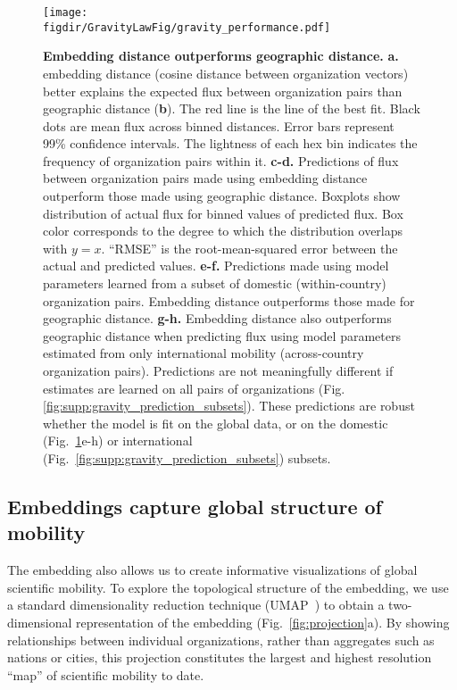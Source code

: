 \documentclass[12pt]{article} %
\def\figdir{../Figs}
\begin{document}
%
%
\begin{figure}[h!]
	\centering
	\texttt{[image: \\figdir/GravityLawFig/gravity\_performance.pdf]}
	\caption{
		\textbf{Embedding distance outperforms geographic distance.}
		\textbf{a.} embedding distance (cosine distance between organization vectors) better explains the expected flux between organization pairs than geographic distance (\textbf{b}).
		The red line is the line of the best fit.
		Black dots are mean flux across binned distances.
		Error bars represent 99\% confidence intervals.
		The lightness of each hex bin indicates the frequency of organization pairs within it.
		\textbf{c-d.} Predictions of flux between organization pairs made using embedding distance outperform those made using geographic distance.
		Boxplots show distribution of actual flux for binned values of predicted flux.
		Box color corresponds to the degree to which the distribution overlaps with $y = x$.
		``RMSE'' is the root-mean-squared error between the actual and predicted values.
		\textbf{e-f.} Predictions made using model parameters learned from a subset of domestic (within-country) organization pairs.
		Embedding distance outperforms those made for geographic distance.
		\textbf{g-h.} Embedding distance also outperforms geographic distance when predicting flux using model parameters estimated from only international mobility (across-country organization pairs).
		Predictions are not meaningfully different if estimates are learned on all pairs of organizations (Fig. \ref{fig:supp:gravity_prediction_subsets}).
		These predictions are robust whether the model is fit on the global data, or on the domestic (Fig.~\ref{fig:gravity_performance}e-h) or international (Fig.~\ref{fig:supp:gravity_prediction_subsets}) subsets.
	}
	\label{fig:gravity_performance}
\end{figure}


\subsection*{Embeddings capture global structure of mobility}

The embedding also allows us to create informative visualizations of global scientific mobility.
To explore the topological structure of the embedding, we use a standard dimensionality reduction technique (UMAP~\autocite{mcinnes2018umap}) to obtain a two-dimensional representation of the embedding (Fig.~\ref{fig:projection}a).
By showing relationships between individual organizations, rather than aggregates such as nations or cities, this projection constitutes the largest and highest resolution ``map'' of scientific mobility to date.
\end{document}

